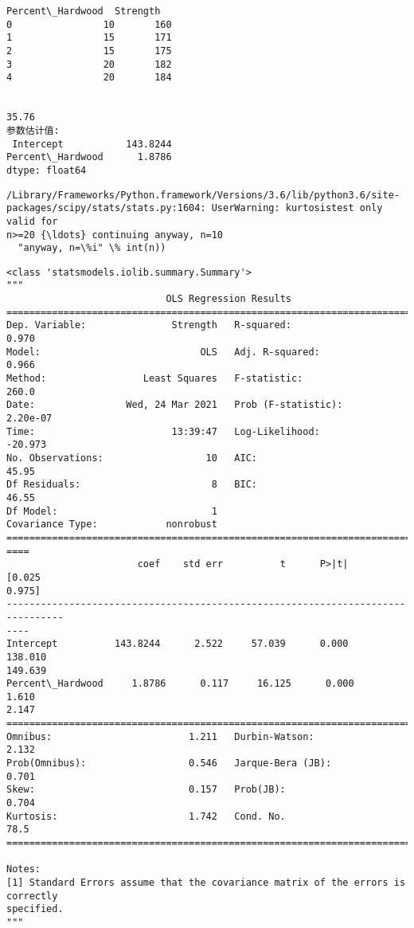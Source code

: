 \documentclass[11pt]{ctexart}
\makeatletter
\newcommand{\boxspacing}{\kern\kvtcb@left@rule\kern\kvtcb@boxsep}
\newcommand{\prompt}[4]{
        {\ttfamily\llap{{\color{#2}[#3]:\hspace{3pt}#4}}\vspace{-\baselineskip}}
    }
\makeatother
\begin{document}
    \begin{Verbatim}[commandchars=\\\{\}]
   Percent\_Hardwood  Strength
0                10       160
1                15       171
2                15       175
3                20       182
4                20       184


35.76
参数估计值:
 Intercept           143.8244
Percent\_Hardwood      1.8786
dtype: float64
    \end{Verbatim}

    \begin{Verbatim}[commandchars=\\\{\}]
/Library/Frameworks/Python.framework/Versions/3.6/lib/python3.6/site-
packages/scipy/stats/stats.py:1604: UserWarning: kurtosistest only valid for
n>=20 {\ldots} continuing anyway, n=10
  "anyway, n=\%i" \% int(n))
    \end{Verbatim}

            \begin{tcolorbox}[breakable, size=fbox, boxrule=.5pt, pad at break*=1mm, opacityfill=0]
\prompt{Out}{outcolor}{2}{\boxspacing}
\begin{Verbatim}[commandchars=\\\{\}]
<class 'statsmodels.iolib.summary.Summary'>
"""
                            OLS Regression Results
==============================================================================
Dep. Variable:               Strength   R-squared:                       0.970
Model:                            OLS   Adj. R-squared:                  0.966
Method:                 Least Squares   F-statistic:                     260.0
Date:                Wed, 24 Mar 2021   Prob (F-statistic):           2.20e-07
Time:                        13:39:47   Log-Likelihood:                -20.973
No. Observations:                  10   AIC:                             45.95
Df Residuals:                       8   BIC:                             46.55
Df Model:                           1
Covariance Type:            nonrobust
================================================================================
====
                       coef    std err          t      P>|t|      [0.025
0.975]
--------------------------------------------------------------------------------
----
Intercept          143.8244      2.522     57.039      0.000     138.010
149.639
Percent\_Hardwood     1.8786      0.117     16.125      0.000       1.610
2.147
==============================================================================
Omnibus:                        1.211   Durbin-Watson:                   2.132
Prob(Omnibus):                  0.546   Jarque-Bera (JB):                0.701
Skew:                           0.157   Prob(JB):                        0.704
Kurtosis:                       1.742   Cond. No.                         78.5
==============================================================================

Notes:
[1] Standard Errors assume that the covariance matrix of the errors is correctly
specified.
"""
\end{Verbatim}
\end{tcolorbox}
        
\end{document}
